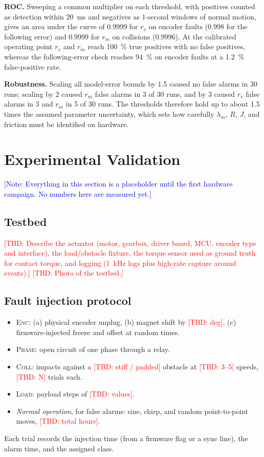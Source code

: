 \documentclass[conference]{IEEEtran}
\newcommand{\TBD}[1]{\textcolor{red}{[TBD: #1]}}
\newcommand{\NOTE}[1]{\textcolor{blue}{[Note: #1]}}
\begin{document}
\textbf{ROC.} Sweeping a common multiplier on each threshold, with positives
counted as detection within \SI{20}{\milli\second} and negatives as 1-second
windows of normal motion, gives an area under the curve of 0.9999 for $r_v$
on encoder faults (0.998 for the following error) and 0.9999 for $r_m$ on
collisions (0.9996). At the calibrated operating point $r_v$ and $r_m$ reach
\SI{100}{\percent} true positives with no false positives, whereas the
following-error check reaches \SI{94}{\percent} on encoder faults at a
\SI{1.2}{\percent} false-positive rate.

\textbf{Robustness.} Scaling all model-error bounds by 1.5 caused no false
alarms in 30 runs; scaling by 2 caused $r_m$ false alarms in 3 of 30 runs, and
by 3 caused $r_v$ false alarms in 3 and $r_m$ in 5 of 30 runs. The thresholds
therefore hold up to about 1.5 times the assumed parameter uncertainty, which
sets how carefully $\lambda_m$, $R$, $J$, and friction must be identified on
hardware.

\section{Experimental Validation}
\label{sec:hw}
\NOTE{Everything in this section is a placeholder until the first hardware
campaign. No numbers here are measured yet.}

\subsection{Testbed}
\TBD{Describe the actuator (motor, gearbox, driver board, MCU, encoder type
and interface), the load/obstacle fixture, the torque sensor used as ground
truth for contact torque, and logging (1~kHz logs plus high-rate capture
around events).} \TBD{Photo of the testbed.}

\subsection{Fault injection protocol}
\begin{itemize}
  \item \textsc{Enc}: (a) physical encoder unplug, (b) magnet shift by
  \TBD{deg}, (c) firmware-injected freeze and offset at random times.
  \item \textsc{Phase}: open circuit of one phase through a relay.
  \item \textsc{Coll}: impacts against a \TBD{stiff / padded} obstacle at
  \TBD{3--5} speeds, \TBD{N} trials each.
  \item \textsc{Load}: payload steps of \TBD{values}.
  \item \emph{Normal operation}, for false alarms: sine, chirp, and random
  point-to-point moves, \TBD{total hours}.
\end{itemize}
Each trial records the injection time (from a firmware flag or a sync line),
the alarm time, and the assigned class.
\end{document}
